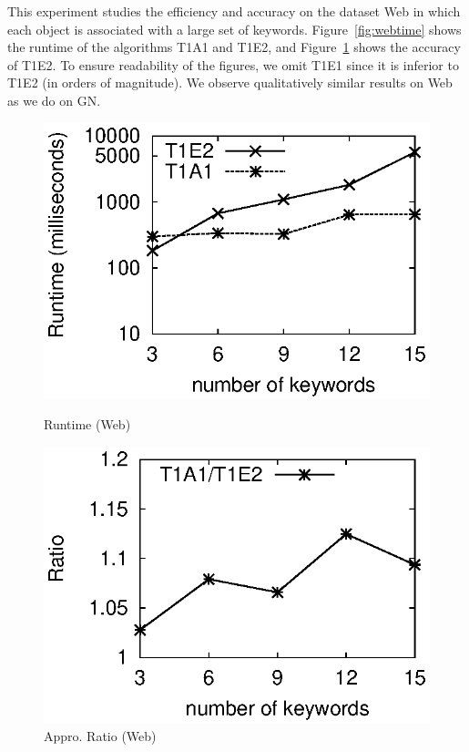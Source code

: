 \documentclass{sig-alternate}
\begin{document}
 This experiment studies the
efficiency and accuracy on the dataset \textsf{Web} in which
each object is associated with a large set of keywords.
%
Figure~\ref{fig:webtime} shows the runtime of the algorithms
T1A1 and T1E2, and Figure~\ref{fig:webratio} shows the accuracy
of T1E2.
%
To ensure readability of the figures, we omit T1E1 since it is
inferior to T1E2 (in orders of magnitude).
%
We observe qualitatively similar results on \textsf{Web} as we do on
\textsf{GN}.

\begin{figure}[h]
\vspace{-1ex}
\begin{minipage}[bt]{1.6in}
 \includegraphics[scale=0.5]{figure/Webtime}\vspace{-2ex}
\caption{Runtime (Web)} \label{fig:webtime}
\end{minipage}\hspace{2mm}
\begin{minipage}[bt]{1.6in}
 \includegraphics[scale=0.5]{figure/Webratio}\vspace{-2ex}
\caption{Appro. Ratio (Web)} \label{fig:webratio}
\end{minipage}
\end{figure}
\end{document}
